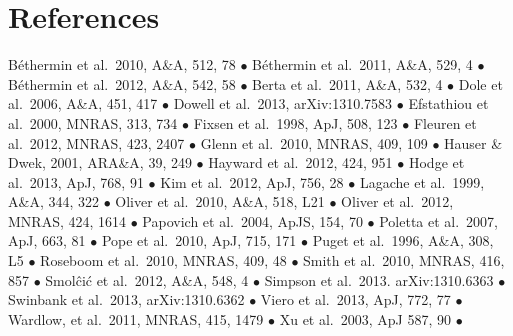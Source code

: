 \documentclass[11pt,a4paper]{article}
\begin{document}
\section{References}
{\small
B\'ethermin et al.\ 2010, A\&A, 512, 78 $\bullet$
B\'ethermin et al.\ 2011, A\&A, 529, 4 $\bullet$ 
B\'ethermin et al.\ 2012, A\&A, 542, 58 $\bullet$
Berta et al.\ 2011, A\&A, 532, 4 $\bullet$
Dole et al.\ 2006, A\&A, 451, 417 $\bullet$
Dowell et al.\ 2013, arXiv:1310.7583 $\bullet$
Efstathiou et al.\ 2000, MNRAS, 313, 734 $\bullet$
Fixsen et al.\ 1998, ApJ, 508, 123 $\bullet$
Fleuren et al.\ 2012, MNRAS, 423, 2407 $\bullet$
Glenn et al.\ 2010, MNRAS, 409, 109 $\bullet$
Hauser \& Dwek, 2001, ARA\&A, 39, 249 $\bullet$
Hayward et al.\ 2012, 424, 951 $\bullet$
Hodge et al.\ 2013, ApJ, 768, 91 $\bullet$
Kim et al.\ 2012, ApJ, 756, 28 $\bullet$
Lagache et al.\ 1999, A\&A, 344, 322 $\bullet$
Oliver et al.\ 2010, A\&A, 518, L21 $\bullet$
Oliver et al.\ 2012, MNRAS, 424, 1614 $\bullet$
Papovich et al.\ 2004, ApJS, 154, 70 $\bullet$
Poletta et al.\ 2007, ApJ, 663, 81 $\bullet$
Pope et al.\ 2010, ApJ, 715, 171 $\bullet$
Puget et al.\ 1996, A\&A, 308, L5 $\bullet$
Roseboom et al.\ 2010, MNRAS, 409, 48 $\bullet$
Smith et al.\ 2010, MNRAS, 416, 857 $\bullet$
Smol\^ci\'c et al.\ 2012, A\&A, 548, 4 $\bullet$
Simpson et al.\ 2013. arXiv:1310.6363 $\bullet$
Swinbank et al.\ 2013, arXiv:1310.6362 $\bullet$
Viero et al.\ 2013, ApJ, 772, 77 $\bullet$
Wardlow, et al.\ 2011, MNRAS, 415, 1479 $\bullet$
Xu et al.\ 2003, ApJ 587, 90 $\bullet$
}


\end{document}
